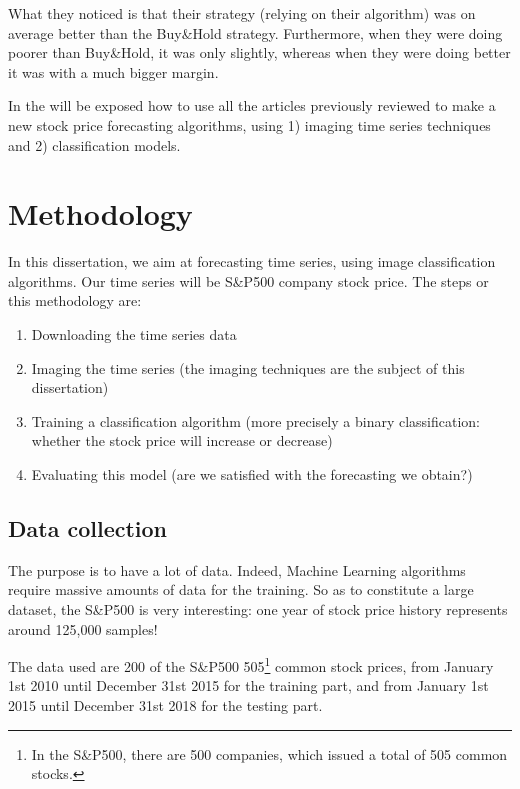 \documentclass[11pt]{article}
\begin{document}
\begin{onehalfspace}
What they noticed is that their strategy (relying on their algorithm) was on average better than the Buy\&Hold strategy. Furthermore, when they were doing poorer than Buy\&Hold, it was only slightly, whereas when they were doing better it was with a much bigger margin. 

In the  will be exposed how to use all the articles previously reviewed to make a new stock price forecasting algorithms, using 1) imaging time series techniques and 2) classification models.

\pagebreak

\section{Methodology}
\label{methodo}

In this dissertation, we aim at forecasting time series, using image classification algorithms. Our time series will be S\&P500 company stock price. The steps or this methodology are:

\begin{enumerate}
    \item Downloading the time series data
    \item Imaging the time series (the imaging techniques are the subject of this dissertation)
    \item Training a classification algorithm (more precisely a binary classification: whether the stock price will increase or decrease)
    \item Evaluating this model (are we satisfied with the forecasting we obtain?)
\end{enumerate}

\subsection{Data collection}

The purpose is to have a lot of data. Indeed, Machine Learning algorithms require massive amounts of data for the training. So as to constitute a large dataset, the S\&P500 is very interesting: one year of stock price history represents around 125,000 samples!

The data used are 200 of the S\&P500 505\footnote{In the S\&P500, there are 500 companies, which issued a total of 505 common stocks.} common stock prices, from January 1st 2010 until December 31st 2015 for the training part, and from January 1st 2015 until December 31st 2018 for the testing part.


\end{onehalfspace}
\end{document}
